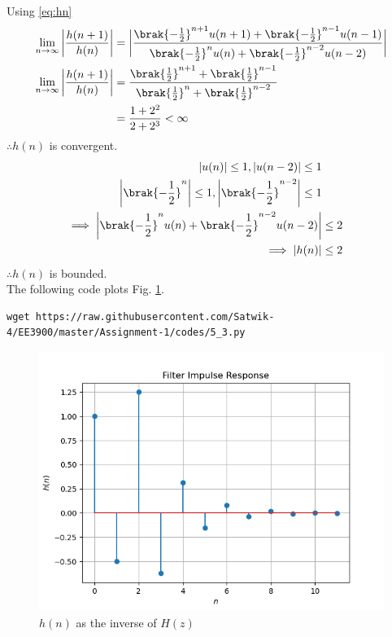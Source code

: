 \documentclass[journal,12pt,twocolumn]{IEEEtran}
\renewcommand\thesection{\arabic{section}}
\begin{document}
\begin{enumerate}[label=\thesection.\arabic*]
\\
\solution 
Using \eqref{eq:hn}
\begin{align}
    \lim_{n \rightarrow{}\infty}\bigg| \frac{h(n+1)}{h(n)}\bigg|&=\bigg|\frac{\brak{-\frac{1}{2}}^{n+1}u(n+1) + \brak{-\frac{1}{2}}^{n-1}u(n-1)}{\brak{-\frac{1}{2}}^{n}u(n) + \brak{-\frac{1}{2}}^{n-2}u(n-2)}\bigg|\\
    \lim_{n \rightarrow{}\infty} \bigg| \frac{h(n+1)}{h(n)}\bigg|&= \frac{\brak{\frac{1}{2}}^{n+1} + \brak{\frac{1}{2}}^{n-1}}{\brak{\frac{1}{2}}^{n} + \brak{\frac{1}{2}}^{n-2}}\\
    &= \frac{1+2^{2}}{2+2^3}<\infty
\end{align}
$\therefore h(n)$ is convergent.\\
\begin{align*}
    |u(n)|\leq1, |u(n-2)|\leq1\\
    \bigg|\brak{-\frac{1}{2}}^n \bigg|\leq1,\bigg|\brak{-\frac{1}{2}}^{n-2} \bigg|\leq1\\ 
    \implies \bigg|\brak{-\frac{1}{2}}^{n}u(n) + \brak{-\frac{1}{2}}^{n-2}u(n-2)\bigg|&\leq2\\
    \implies |h(n)|&\leq2
\end{align*}
$\therefore h(n)$ is bounded.\\
The following code plots Fig. \ref{fig:hn}.
\begin{lstlisting}
wget https://raw.githubusercontent.com/Satwik-4/EE3900/master/Assignment-1/codes/5_3.py
\end{lstlisting}
\begin{figure}[!ht]
\centering
\includegraphics[width=\columnwidth]{figures/Figure_3.png}
\caption{$h(n)$ as the inverse of $H(z)$}
\label{fig:hn}
\end{figure}


\end{enumerate}
\end{document}
